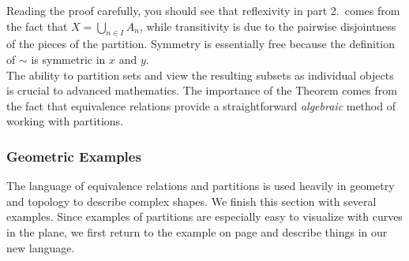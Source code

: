 \noindent Reading the proof carefully, you should see that reflexivity in part 2.\ comes from the fact that $X=\bigcup\limits_{n\in I}A_n$, while transitivity is due to the pairwise disjointness of the pieces of the partition. Symmetry is essentially free because the definition of $\sim$ is symmetric in $x$ and $y$.\\

\noindent The ability to partition sets and view the resulting subsets as individual objects is crucial to advanced mathematics. The importance of the Theorem comes from the fact that equivalence relations provide a straightforward \emph{algebraic} method of working with partitions.


\subsubsection*{Geometric Examples}

The language of equivalence relations and partitions is used heavily in geometry and topology to describe complex shapes. We finish this section with several examples. Since examples of partitions are especially easy to visualize with curves in the plane, we first return to the example on page \pageref{ex:equivcircle} and describe things in our new language.

